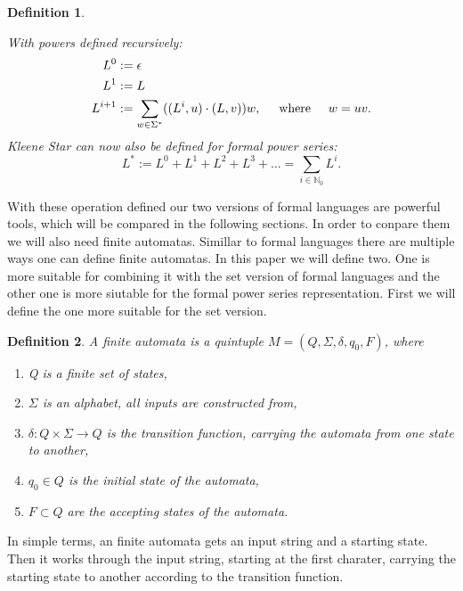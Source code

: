 \documentclass[12pt,letterpaper]{article}
\newtheorem{definition}{Definition}
\begin{document}
\begin{definition}
\begin{center}
  \end{center}
  With powers defined recursively:
  \begin{align*}
    L^0 &:= \epsilon\\
    L^1 &:= L\\
    L^{i+1} &:= \sum_{w \in \Sigma^*} ((L^i,u)\cdot (L,v))w, 
    \hspace{0.5cm} \text{where} \hspace{0.5cm} w = uv.
  \end{align*}
  Kleene Star can now also be defined for formal power series:
  \[
    L^* := L^0 + L^1 + L^2 + L^3 + \dots = \sum_{i \in \mathbb{N}_0} L^i.
  \]
\end{definition}
With these operation defined our two versions of formal languages are 
powerful tools, which will be compared in the following sections. In order
to conpare them we will also need finite automatas. Simillar to formal languages
there are multiple ways one can define finite automatas. In this paper we
will define two. One is more suitable for combining it with the set version
of formal languages and the other one is more siutable for the formal power
series representation. First we will define the one more suitable for the
set version.
\begin{definition}
  A finite automata is a quintuple $M = (Q, \Sigma, \delta, q_0, F)$, 
  where
  \begin{enumerate}
    \item Q is a finite set of states,
    \item $\Sigma$ is an alphabet, all inputs are constructed from,
    \item $\delta: Q \times \Sigma \to Q$ is the transition function,
      carrying the automata from one state to another,
    \item $q_0 \in Q$ is the initial state of the automata,
    \item $F \subset Q$ are the accepting states of the automata.
  \end{enumerate}
\end{definition}
In simple terms, an finite automata gets an input string and a starting 
state. Then it works through the input string, starting at the first charater,
carrying the starting state to another according to the transition function.
\end{document}
